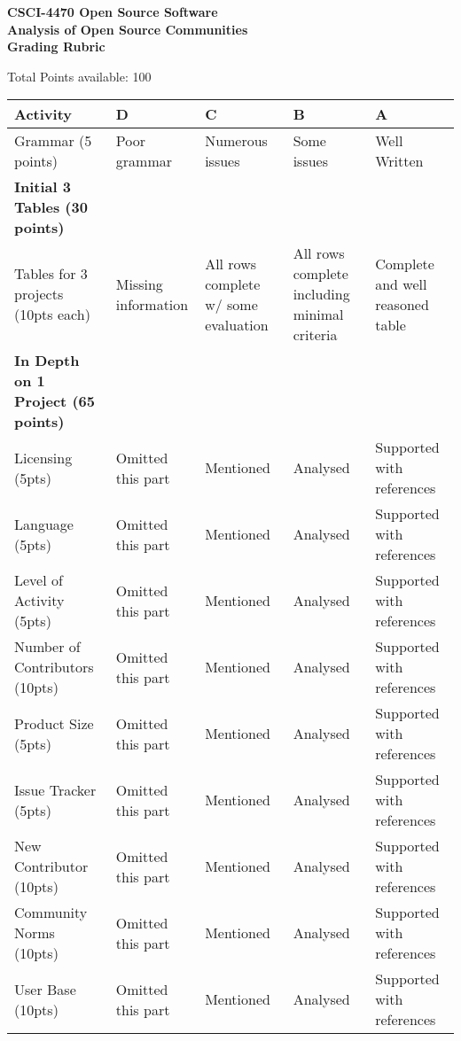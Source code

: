 \documentclass[11pt]{article}
\begin{document}
\begin{center}
\Large
\textbf{CSCI-4470 Open Source Software \\
Analysis of Open Source Communities \\
Grading Rubric}
\end{center}

Total Points available: 100 \\
\begin{tabularx}{\linewidth}{|l|X|X|X|X|}
	\hline
	Activity & D & C & B & A \\ \hline
	Grammar (5 points) & Poor grammar & Numerous issues & Some issues & Well Written \\ \hline
	\textbf{Initial 3 Tables (30 points)} & & & & \\ \hline
	Tables for 3 projects (10pts each) & Missing information & All rows complete w/ some evaluation & All rows complete including minimal criteria & Complete and well reasoned table \\ \hline
    \textbf{In Depth on 1 Project (65 points)}  & & & & \\ \hline
	Licensing (5pts) & Omitted this part & Mentioned & Analysed &Supported with references \\ \hline
	Language (5pts) & Omitted this part & Mentioned & Analysed &Supported with references \\ \hline
	Level of Activity (5pts) & Omitted this part & Mentioned & Analysed &Supported with references \\ \hline
	Number of Contributors (10pts) & Omitted this part & Mentioned & Analysed &Supported with references \\ \hline
	Product Size (5pts) & Omitted this part & Mentioned & Analysed &Supported with references \\ \hline
	Issue Tracker (5pts) & Omitted this part & Mentioned & Analysed &Supported with references \\ \hline
	New Contributor (10pts) & Omitted this part & Mentioned & Analysed &Supported with references \\ \hline
	Community Norms (10pts) & Omitted this part & Mentioned & Analysed &Supported with references \\ \hline
	User Base (10pts) & Omitted this part & Mentioned & Analysed &Supported with references \\ \hline
\end{tabularx}
\end{document}
